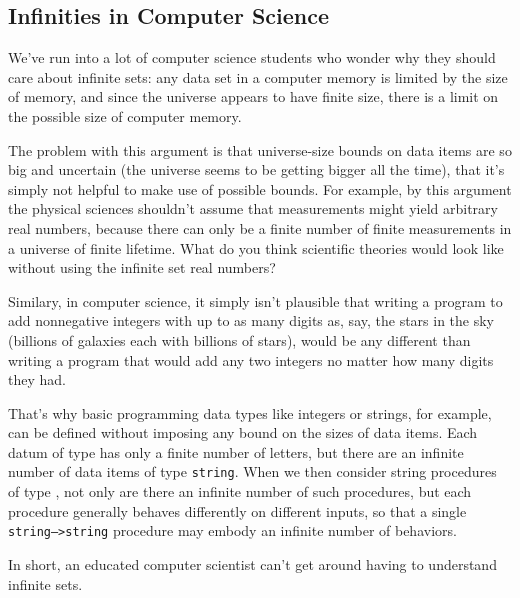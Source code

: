 \subsection{Infinities in Computer Science}

We've run into a lot of computer science students who wonder why they
should care about infinite sets: any data set in a computer memory is
limited by the size of memory, and since the universe appears to have
finite size, there is a limit on the possible size of computer memory.

\iffalse need to learn all this abstract theory of infinite sets, and this
is a good question.  \fi

The problem with this argument is that universe-size bounds on data items
are so big and uncertain (the universe seems to be getting bigger all the
time), that it's simply not helpful to make use of possible bounds.  For
example, by this argument the physical sciences shouldn't assume that
measurements might yield arbitrary real numbers, because there can only be
a finite number of finite measurements in a universe of finite lifetime.
What do you think scientific theories would look like without using the
infinite set real numbers?

Similary, in computer science, it simply isn't plausible that writing a
program to add nonnegative integers with up to as many digits as, say, the
stars in the sky (billions of galaxies each with billions of stars), would
be any different than writing a program that would add any two integers
no matter how many digits they had.

That's why basic programming data types like integers or strings, for
example, can be defined without imposing any bound on the sizes of
data items.  Each datum of type  has only a
finite number of letters, but there are an infinite number of data items
of type \texttt{string}.  When we then consider string procedures of
type , not only are there
an infinite number of such procedures, but each procedure generally
behaves differently on different inputs, so that a single
\texttt{string-->string} procedure may embody an infinite number of
behaviors.

In short, an educated computer scientist can't get around having to
understand infinite sets.

\begin{problems}

\classproblems
{}






\homeworkproblems


\end{problems}

